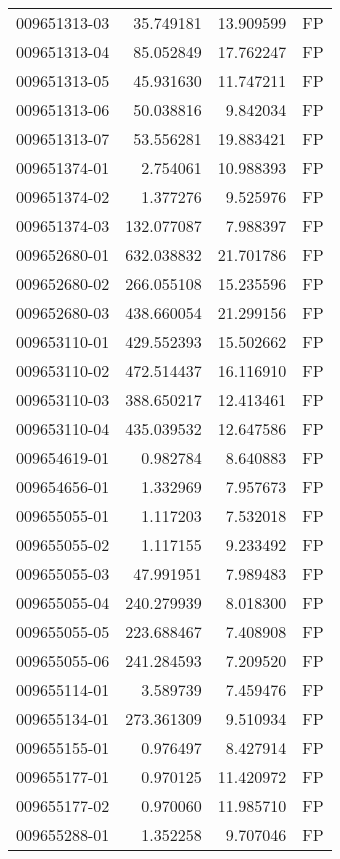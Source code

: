 \begin{tabular}{lrrl}
009651313-03 &   35.749181 &    13.909599 &   FP \\
009651313-04 &   85.052849 &    17.762247 &   FP \\
009651313-05 &   45.931630 &    11.747211 &   FP \\
009651313-06 &   50.038816 &     9.842034 &   FP \\
009651313-07 &   53.556281 &    19.883421 &   FP \\
009651374-01 &    2.754061 &    10.988393 &   FP \\
009651374-02 &    1.377276 &     9.525976 &   FP \\
009651374-03 &  132.077087 &     7.988397 &   FP \\
009652680-01 &  632.038832 &    21.701786 &   FP \\
009652680-02 &  266.055108 &    15.235596 &   FP \\
009652680-03 &  438.660054 &    21.299156 &   FP \\
009653110-01 &  429.552393 &    15.502662 &   FP \\
009653110-02 &  472.514437 &    16.116910 &   FP \\
009653110-03 &  388.650217 &    12.413461 &   FP \\
009653110-04 &  435.039532 &    12.647586 &   FP \\
009654619-01 &    0.982784 &     8.640883 &   FP \\
009654656-01 &    1.332969 &     7.957673 &   FP \\
009655055-01 &    1.117203 &     7.532018 &   FP \\
009655055-02 &    1.117155 &     9.233492 &   FP \\
009655055-03 &   47.991951 &     7.989483 &   FP \\
009655055-04 &  240.279939 &     8.018300 &   FP \\
009655055-05 &  223.688467 &     7.408908 &   FP \\
009655055-06 &  241.284593 &     7.209520 &   FP \\
009655114-01 &    3.589739 &     7.459476 &   FP \\
009655134-01 &  273.361309 &     9.510934 &   FP \\
009655155-01 &    0.976497 &     8.427914 &   FP \\
009655177-01 &    0.970125 &    11.420972 &   FP \\
009655177-02 &    0.970060 &    11.985710 &   FP \\
009655288-01 &    1.352258 &     9.707046 &   FP \\

\end{tabular}
